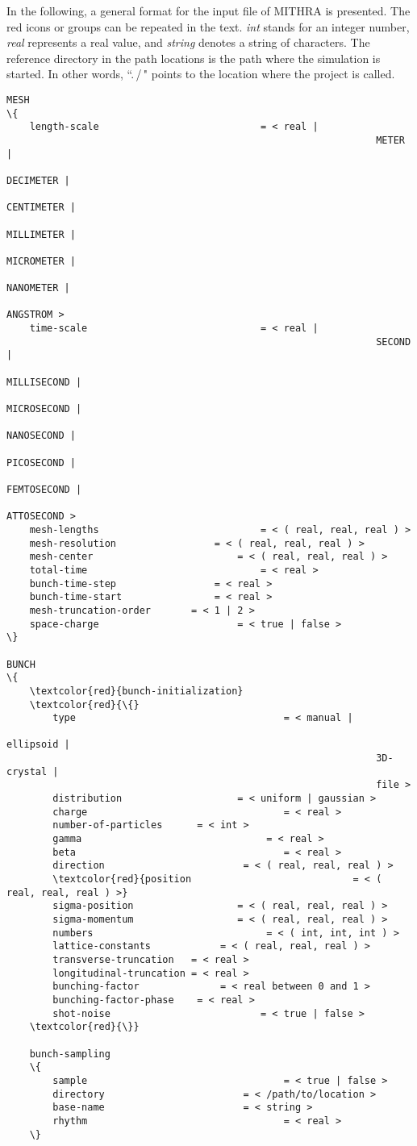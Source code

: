 \documentclass[9pt,a4paper]{article}
\begin{document}
\begin{landscape}
\begin{multicols}{3}
\setlength{\columnseprule}{0.1pt}
%
In the following, a general format for the input file of MITHRA is presented. The red icons or groups can be repeated in the text. \emph{int} stands for an integer number, \emph{real} represents a real value, and \emph{string} denotes a string of characters. The reference directory in the path locations is the path where the simulation is started. In other words, ``.\,/\," points to the location where the project is called.

\begin{Verbatim}[fontsize=\footnotesize, tabsize=2, fontfamily=courier,	fontseries=b, commandchars=\\\{\}]
MESH
\{
	length-scale							= < real | 
																METER | 
																DECIMETER | 
																CENTIMETER | 
																MILLIMETER | 
																MICROMETER |
																NANOMETER | 
																ANGSTROM >
	time-scale								= < real | 
																SECOND | 
																MILLISECOND | 
																MICROSECOND | 
																NANOSECOND | 
																PICOSECOND | 
																FEMTOSECOND | 
																ATTOSECOND >
	mesh-lengths							= < ( real, real, real ) >
	mesh-resolution		 			= < ( real, real, real ) >
	mesh-center				 			= < ( real, real, real ) >
	total-time								= < real >
	bunch-time-step		 			= < real >
	bunch-time-start  				= < real >
	mesh-truncation-order 		= < 1 | 2 >
	space-charge  						= < true | false >
\}

BUNCH
\{
	\textcolor{red}{bunch-initialization}
	\textcolor{red}{\{}
		type  									= < manual | 
																ellipsoid | 
																3D-crystal | 
																file >
		distribution  					= < uniform | gaussian >
		charge  								= < real >
		number-of-particles  	 = < int >
		gamma  								 = < real >
		beta  									= < real >
		direction  						 = < ( real, real, real ) >
		\textcolor{red}{position  							= < ( real, real, real ) >}
		sigma-position  				= < ( real, real, real ) >
		sigma-momentum  				= < ( real, real, real ) >
		numbers								 = < ( int, int, int ) >
		lattice-constants			 = < ( real, real, real ) >
		transverse-truncation   = < real >
		longitudinal-truncation = < real >
		bunching-factor  			 = < real between 0 and 1 >
		bunching-factor-phase	 = < real >
		shot-noise  						= < true | false >
	\textcolor{red}{\}}

	bunch-sampling
	\{
		sample  								= < true | false >
		directory  						 = < /path/to/location >
		base-name  						 = < string >
		rhythm  								= < real >
	\}


\end{Verbatim}
\end{multicols}
\end{landscape}
\end{document}
